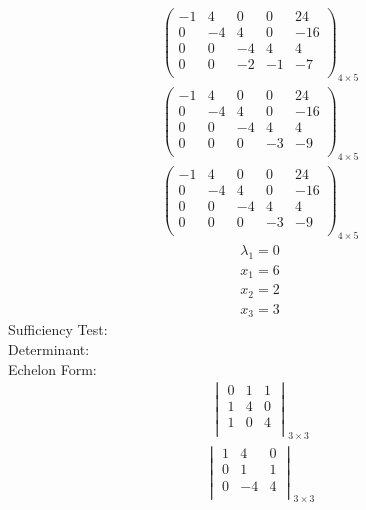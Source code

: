 \documentclass{article}
\begin{document}
\begin{align*}
\left(
\begin{array}{cccc|c}
-1 & 4 & 0 & 0 & 24\\
0 & -4 & 4 & 0 & -16\\
0 & 0 & -4 & 4 & 4\\
0 & 0 & -2 & -1 & -7\\
\end{array}
\right)_{4\times 5}
\end{align*}
\begin{align*}
\left(
\begin{array}{cccc|c}
-1 & 4 & 0 & 0 & 24\\
0 & -4 & 4 & 0 & -16\\
0 & 0 & -4 & 4 & 4\\
0 & 0 & 0 & -3 & -9\\
\end{array}
\right)_{4\times 5}
\end{align*}
\begin{align*}
\left(
\begin{array}{cccc|c}
-1 & 4 & 0 & 0 & 24\\
0 & -4 & 4 & 0 & -16\\
0 & 0 & -4 & 4 & 4\\
0 & 0 & 0 & -3 & -9\\
\end{array}
\right)_{4\times 5}
\end{align*}
\begin{align*}
\lambda_{1}=0\end{align*}
\begin{align*}
x_{1}=6\end{align*}
\begin{align*}
x_{2}=2\end{align*}
\begin{align*}
x_{3}=3\end{align*}
Sufficiency Test:\\
Determinant:\\
Echelon Form:\\
\begin{align*}
\begin{vmatrix}
0 & 1 & 1\\
1 & 4 & 0\\
1 & 0 & 4\\
\end{vmatrix}_{3\times 3}
\end{align*}
\begin{align*}
\begin{vmatrix}
1 & 4 & 0\\
0 & 1 & 1\\
0 & -4 & 4\\
\end{vmatrix}_{3\times 3}
\end{align*}
\end{document}
